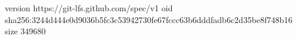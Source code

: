version https://git-lfs.github.com/spec/v1
oid sha256:3244d444e0d9036b5fc3c53942730fe67fccc63b6dddfadb6c2d35be8f748b16
size 349680
